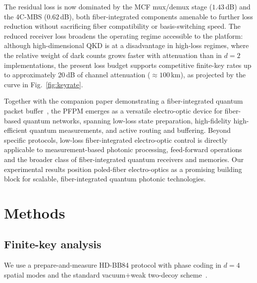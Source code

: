 \documentclass[pra,aps,reprint,nofootinbib,superscriptaddress,floatfix]{revtex4-2}
\begin{document}
The residual loss is now dominated by the MCF mux/demux stage ($1.43\,$dB) and the 4C-MBS ($0.62\,$dB), both fiber-integrated components amenable to further loss reduction without sacrificing fiber compatibility or basis-switching speed. The reduced receiver loss broadens the operating regime accessible to the platform: although high-dimensional QKD is at a disadvantage in high-loss regimes, where the relative weight of dark counts grows faster with attenuation than in $d=2$ implementations, the present loss budget supports competitive finite-key rates up to approximately $20\,$dB of channel attenuation ($\approx 100\,$km), as projected by the curve in Fig.~\ref{fig:keyrate}.

Together with the companion paper demonstrating a fiber-integrated quantum packet buffer~\cite{SpegelLexne2026Buffer}, the PFPM emerges as a versatile electro-optic device for fiber-based quantum networks, spanning low-loss state preparation, high-fidelity high-efficient quantum measurements, and active routing and buffering. Beyond specific protocols, low-loss fiber-integrated electro-optic control is directly applicable to measurement-based photonic processing, feed-forward operations and the broader class of fiber-integrated quantum receivers and memories. Our experimental results position poled-fiber electro-optics as a promising building block for scalable, fiber-integrated quantum photonic technologies.

\section*{Methods}
\label{sec:methods}

\subsection*{Finite-key analysis}

We use a prepare-and-measure HD-BB84 protocol with phase coding in $d=4$ spatial modes and the standard vacuum$+$weak two-decoy scheme~\cite{Lo2005,Ma2005}. 
\end{document}
